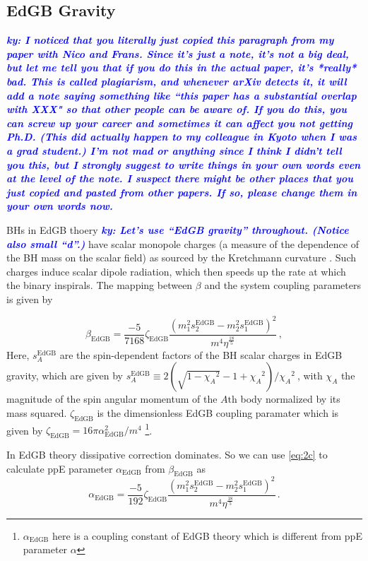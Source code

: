\documentclass[11pt]{article}
\newcommand{\ky}[1]{\textcolor{blue}{\it{\textbf{ky: #1}}} }
\begin{document}
 
  \subsection{EdGB Gravity}

\ky{I noticed that you literally just copied this paragraph from my paper with Nico and Frans. Since it's just a note, it's not a big deal, but let me tell you that if you do this in the actual paper, it's *really* bad. This is called plagiarism, and whenever arXiv detects it, it will add a note saying something like ``this paper has a substantial overlap with XXX" so that other people can be aware of. If you do this, you can screw up your career and sometimes it can affect you not getting Ph.D. (This did actually happen to my colleague in Kyoto when I was a grad student.) I'm not mad or anything since I think I didn't tell you this, but I strongly suggest to write things in your own words even at the level of the note. I suspect there might be other places that you just copied and pasted from other papers. If so, please change them in your own words now.}
  
 BHs in EdGB thoery  \ky{Let's use ``EdGB gravity'' throughout. (Notice also small ``d''.)} have scalar monopole charges (a measure of the dependence of the BH mass on the scalar field) as sourced by the Kretchmann curvature \cite{Yunes:2016jcc}. Such charges induce scalar dipole radiation, which then speeds up the rate at which the binary inspirals. The mapping between $\beta$ and the system coupling parameters is given by \cite{Yunes:2016jcc,Yagi:2011xp}
 
 \begin{equation}
 \beta_{\text{EdGB}}=\frac{-5}{7168}\zeta_{\text{EdGB}}\frac{(m_1^2s_2^{\text{EdGB}}-m_2^2s_1^{\text{EdGB}})^2}{m^4\eta^{\frac{18}{5}}}\,,
 \end{equation}
 Here, $s_{A}^{\text{EdGB}}$ are the spin-dependent factors of the BH scalar charges in EdGB gravity, which are given by $s_{A}^{\text{EdGB}}\equiv 2(\sqrt{1-{\chi_A}^2}-1+{\chi_A}^2)/{\chi_A}^2~$\cite{Berti:2018cxi,Prabhu:2018aun}, with $\chi_A$ the magnitude of the spin angular momentum of the $\mathit{A}\text{th}$ body normalized by its mass squared. $\zeta_{\text{EdGB}}$ is the dimensionless EdGB coupling paramater which is given by $\zeta_{\text{EdGB}}=16 \pi \alpha_{\text{EdGB}}^2/m^4$ \footnote{$\alpha_{\text{EdGB}}$ here  is a coupling constant of EdGB theory which is different from ppE parameter $\alpha$}.


 \hspace{15.5pt} In EdGB theory dissipative correction dominates. So we can use \eqref{eq:2c} to calculate ppE parameter $\alpha_{\text{EdGB}}$ from $\beta_{\text{EdGB}}$ as  
 \begin{equation}
 \alpha_{\text{EdGB}}=\frac{-5}{192}\zeta_{\text{EdGB}}\frac{(m_1^2s_2^{\text{EdGB}}-m_2^2s_1^{\text{EdGB}})^2}{m^4\eta^{\frac{18}{5}}}\,.
 \end{equation}
 
\end{document}
